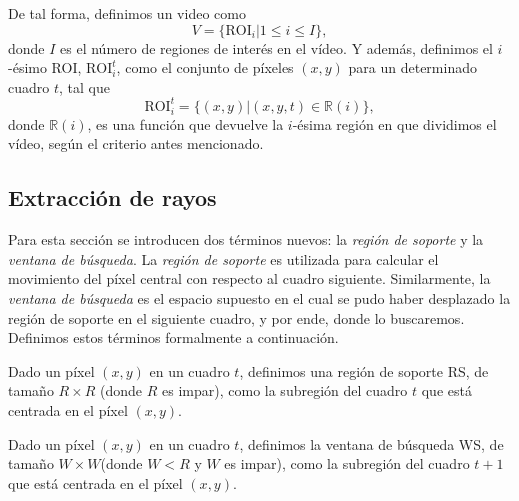 	De tal forma, definimos un video como 
	\begin{equation}\label{algoritmo:eq:video}		
		V = \{\text{ROI}_i | 1 \leq i \le I\}, 
	\end{equation}
	donde $I$ es el número de regiones de interés en el vídeo. Y además, definimos el $i$-ésimo ROI, $\text{ROI}_i^t$, como el conjunto de píxeles $(x,y)$ para un determinado cuadro $t$, tal que
	\begin{equation}\label{algoritmo:eq:roi}
		\text{ROI}_{i}^{t} = \{(x,y) | (x,y,t) \in \mathds{R}(i)\},
	\end{equation}
	donde $\mathds{R}(i)$, es una función que devuelve la $i$-ésima región en que dividimos el vídeo, según el criterio antes mencionado.

	\subsection{Extracción de rayos}
	\label{algoritmo:ext_rayos}
	
	Para esta sección se introducen dos términos nuevos: la \textit{región de soporte} y la \textit{ventana de búsqueda}. La \textit{región de soporte} es utilizada para calcular el movimiento del píxel central con respecto al cuadro siguiente. Similarmente, la \textit{ventana de búsqueda} es el espacio supuesto en el cual se pudo haber desplazado la región de soporte en el siguiente cuadro, y por ende, donde lo buscaremos. Definimos estos términos formalmente a continuación.
	
	\begin{definition}	
  Dado un píxel $(x,y)$ en un cuadro $t$, definimos una región de soporte RS, de tamaño $R \times R$ (donde $R$ es impar), como la subregión del cuadro $t$ que está centrada en el píxel $(x,y)$.
	\end{definition}

	\begin{definition}
	Dado un píxel $(x,y)$ en un cuadro $t$, definimos la ventana de búsqueda WS, de  tamaño $W \times W$(donde $W < R$ y $W$ es impar), como la subregión del cuadro $t+1$ que está centrada en el píxel $(x,y)$.
	\end{definition}
		
